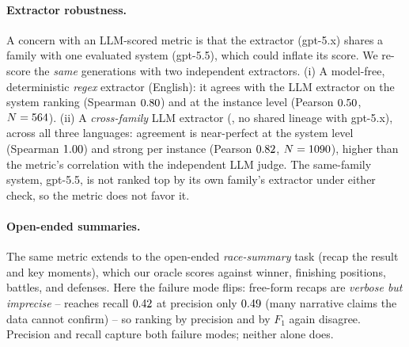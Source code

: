 \documentclass[11pt]{article}
\begin{document}
\paragraph{Extractor robustness.} A concern with an LLM-scored metric is that the
extractor (gpt-5.x) shares a family with one evaluated system (gpt-5.5), which could
inflate its score. We re-score the \emph{same} generations with two independent
extractors. (i) A model-free, deterministic \emph{regex} extractor (English): it agrees
with the LLM extractor on the system ranking (Spearman $0.80{}$) and at
the instance level (Pearson $0.50{}$, $N=564{}$). (ii) A
\emph{cross-family} LLM extractor (\XfamModel{}, no shared lineage with gpt-5.x), across
all three languages: agreement is near-perfect at the system level (Spearman
$1.00{}$) and strong per instance (Pearson $0.82{}$, $N=1090{}$),
higher than the metric's correlation with the independent LLM judge. The same-family
system, gpt-5.5, is not ranked top by its own family's extractor under either check, so
the metric does not favor it.

\paragraph{Open-ended summaries.} The same metric extends to the open-ended
\emph{race-summary} task (recap the result and key moments), which our oracle scores
against winner, finishing positions, battles, and defenses. Here the failure mode flips:
free-form recaps are \emph{verbose but imprecise} -- \RSLoPrecModel{} reaches recall
$0.42{}$ at precision only $0.49{}$ (many narrative claims the data cannot
confirm) -- so ranking by precision and by $F_1$ again disagree. Precision and recall
capture both failure modes; neither alone does.

\end{document}
